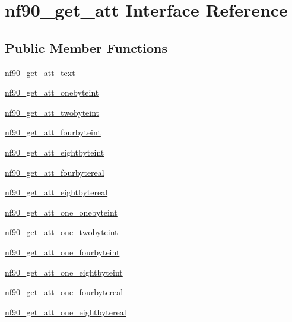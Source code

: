 \hypertarget{interfacenf90__get__att}{}\section{nf90\+\_\+get\+\_\+att Interface Reference}
\label{interfacenf90__get__att}
\subsection*{Public Member Functions}
\begin{DoxyCompactItemize}
\item 
\hyperlink{interfacenf90__get__att_a2e31cb3274ed0d2672cebe34cc35afb4}{nf90\+\_\+get\+\_\+att\+\_\+text}
\item 
\hyperlink{interfacenf90__get__att_a925b9f13c135c9cf0eb953b0fc9b56ea}{nf90\+\_\+get\+\_\+att\+\_\+onebyteint}
\item 
\hyperlink{interfacenf90__get__att_a3b05ff02705737bb0a8b9a2c57c2faae}{nf90\+\_\+get\+\_\+att\+\_\+twobyteint}
\item 
\hyperlink{interfacenf90__get__att_a2769bff1cc564a16caf1018a7b66e08d}{nf90\+\_\+get\+\_\+att\+\_\+fourbyteint}
\item 
\hyperlink{interfacenf90__get__att_a1d5a83272a21fbc8563e61d689b7bf0b}{nf90\+\_\+get\+\_\+att\+\_\+eightbyteint}
\item 
\hyperlink{interfacenf90__get__att_a3153b2a93aceebdce2259b6bc7f2efac}{nf90\+\_\+get\+\_\+att\+\_\+fourbytereal}
\item 
\hyperlink{interfacenf90__get__att_a39f151c5a9c05e9d901961b8520721b2}{nf90\+\_\+get\+\_\+att\+\_\+eightbytereal}
\item 
\hyperlink{interfacenf90__get__att_aa0c3f11f09e283d4986b43f4c69715f5}{nf90\+\_\+get\+\_\+att\+\_\+one\+\_\+onebyteint}
\item 
\hyperlink{interfacenf90__get__att_aeb5ded190f85ceab783a01e48c5ee744}{nf90\+\_\+get\+\_\+att\+\_\+one\+\_\+twobyteint}
\item 
\hyperlink{interfacenf90__get__att_a0f5f0ed88ccc73376dfd57f2b583172f}{nf90\+\_\+get\+\_\+att\+\_\+one\+\_\+fourbyteint}
\item 
\hyperlink{interfacenf90__get__att_a5845afe0340a8020558a6135587e7fe3}{nf90\+\_\+get\+\_\+att\+\_\+one\+\_\+eightbyteint}
\item 
\hyperlink{interfacenf90__get__att_a05f2eb7dfd3ad20ab41f48e3bfcf2645}{nf90\+\_\+get\+\_\+att\+\_\+one\+\_\+fourbytereal}
\item 
\hyperlink{interfacenf90__get__att_aeb522573e4f2fd029f0d257439ec93d9}{nf90\+\_\+get\+\_\+att\+\_\+one\+\_\+eightbytereal}
\end{DoxyCompactItemize}


